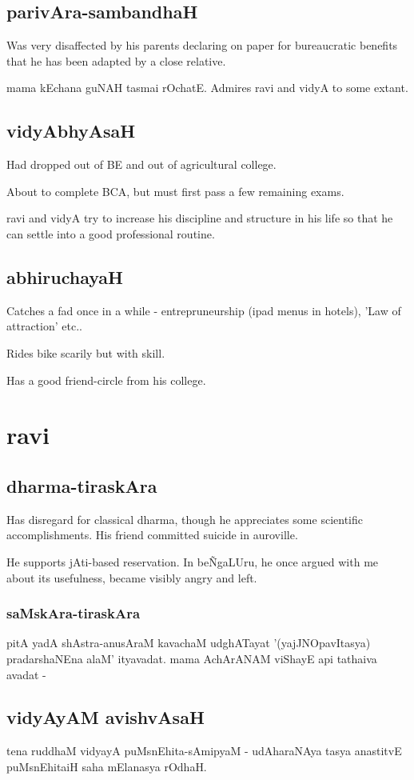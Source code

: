 \documentclass[oneside, article]{memoir}
\begin{document}
\section{parivAra-sambandhaH}
Was very disaffected by his parents declaring on paper for bureaucratic benefits that he has been adapted by a close relative.

mama kEchana guNAH tasmai rOchatE. Admires ravi and vidyA to some extant.

\section{vidyAbhyAsaH}
Had dropped out of BE and out of agricultural college.

About to complete BCA, but must first pass a few remaining exams.

ravi and vidyA try to increase his discipline and structure in his life so that he can settle into a good professional routine.

\section{abhiruchayaH}
Catches a fad once in a while - entrepruneurship (ipad menus in hotels), 'Law of attraction' etc..

Rides bike scarily but with skill.

Has a good friend-circle from his college.

\chapter{ravi}
\section{dharma-tiraskAra}
Has disregard for classical dharma, though he appreciates some scientific accomplishments. His friend committed suicide in auroville.

He supports jAti-based reservation. In be\~NgaLUru, he once argued with me about its usefulness, became visibly angry and left.

\subsection{saMskAra-tiraskAra}
pitA yadA shAstra-anusAraM kavachaM udghATayat '(yajJNOpavItasya) pradarshaNEna alaM' ityavadat. mama AchArANAM viShayE api tathaiva avadat -\tbc

\section{vidyAyAM avishvAsaH}
tena ruddhaM vidyayA puMsnEhita-sAmipyaM - udAharaNAya tasya anastitvE puMsnEhitaiH saha mElanasya rOdhaH.
\end{document}
